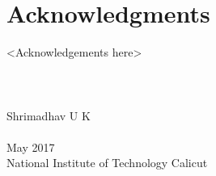 \cleardoublepage
{}
{}
\chapter*{Acknowledgments}
\vspace{1.0in}
<Acknowledgements here>
\\
\\
\\
\\
Shrimadhav U K \\
\\
May 2017\\
{National Institute of Technology Calicut}\\
\newpage

